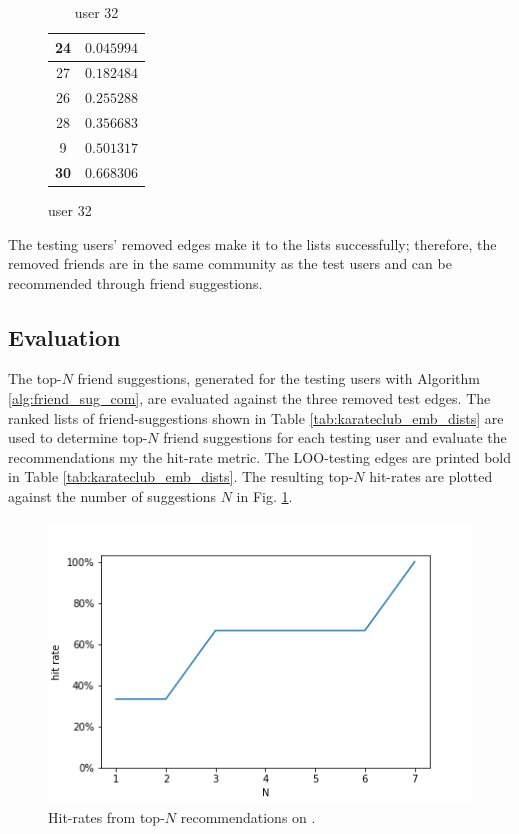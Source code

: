 \documentclass[conference]{IEEEtran}
\begin{document}
\begin{table}
\begin{subfigure}{.4\textwidth}
\begin{tabular}{ c | r }
            \hline
            24          & $0.045994$ \\
            \hline
            27          & $0.182484$ \\
            \hline
            26          & $0.255288$ \\
            \hline
            28          & $0.356683$ \\
            \hline
            9           & $0.501317$ \\
            \hline
            \textbf{30} & $0.668306$ \\
        \end{tabular}
        \caption{user 32}
    \end{subfigure}
\end{table}

The testing users' removed edges make it to the lists successfully; therefore, the removed friends are in the same community as the test users and can be recommended through friend suggestions.

\subsection{Evaluation}

The top-$N$ friend suggestions, generated for the testing users with Algorithm \ref{alg:friend_sug_com}, are evaluated against the three removed test edges.
The ranked lists of friend-suggestions shown in Table \ref{tab:karateclub_emb_dists} are used to determine top-$N$ friend suggestions for each testing user and evaluate the recommendations my the hit-rate metric. The LOO-testing edges are printed bold in Table \ref{tab:karateclub_emb_dists}. The resulting top-$N$ hit-rates are plotted against the number of suggestions $N$ in Fig. \ref{fig:karateclub_hitrates}.

\begin{figure}[htbp]
    \centering
    \includegraphics[width=.4\textwidth]{images/karateclub/hit_rates.png}
    \caption{Hit-rates from top-$N$ recommendations on \citet{KarateClubDS}.}
    \label{fig:karateclub_hitrates}
\end{figure}
\end{document}
